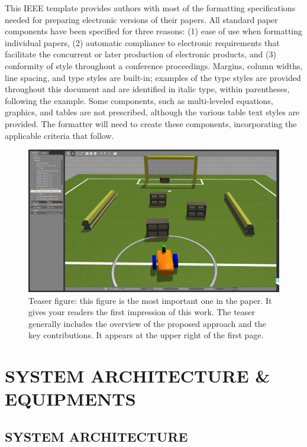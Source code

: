 \documentclass[letterpaper, 10 pt, conference]{ieeeconf}  %
\begin{document}
This IEEE template provides authors with most of the formatting specifications needed for preparing electronic versions of their papers. All standard paper components have been specified for three reasons: (1) ease of use when formatting individual papers, (2) automatic compliance to electronic requirements that facilitate the concurrent or later production of electronic products, and (3) conformity of style throughout a conference proceedings. Margins, column widths, line spacing, and type styles are built-in; examples of the type styles are provided throughout this document and are identified in italic type, within parentheses, following the example. Some components, such as multi-leveled equations, graphics, and tables are not prescribed, although the various table text styles are provided. The formatter will need to create these components, incorporating the applicable criteria that follow.

\begin{figure}[t]
\includegraphics[width=0.95\columnwidth]{gazebo_view}
\centering
\caption{Teaser figure: this figure is the most important one in the paper. It gives your readers the first impression of this work. The teaser generally includes the overview of the proposed approach and the key contributions. It appears at the upper right of the first page.}
\end{figure}

\section{SYSTEM ARCHITECTURE \& EQUIPMENTS}

\subsection{SYSTEM ARCHITECTURE}
\end{document}
